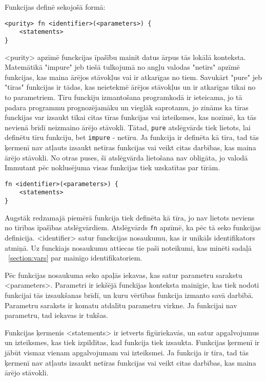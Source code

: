 \documentclass[12pt,a4paper]{report}
\begin{document}
Funkcijas definē sekojošā formā:
\begin{verbatim}
<purity> fn <identifier>(<parameters>) {
    <statements>
}
\end{verbatim}

<purity> apzīmē funckcijas īpašību mainīt datus ārpus tās lokālā konteksta. Matemātikā "impure" jeb tiešā tulkojumā no angļu valodas "netīrs" apzīmē funkcijas, kas maina ārējos stāvokļus vai ir atkarīgas no tiem. Savukārt "pure" jeb "tīras" funkcijas ir tādas, kas neietekmē ārējos stāvokļus un ir atkarīgas tikai no to parametriem. Tīru funckiju izmantošana programkodā ir ieteicama, jo tā padara programmu prognozējamāku un vieglāk saprotamu, jo zināms ka tīras funckijas var izsaukt tikai citas tīras funkcijas vai izteiksmes, kas nozīmē, ka tās nevienā brīdī neizmaino ārējo stāvokli. Tātad, \texttt{pure} atslēgvārds tiek lietots, lai definētu tīru funkciju, bet \texttt{impure} - netīru. Ja funkcija ir definēta kā tīra, tad tās ķermenī nav atļauts izsaukt netīras funkcijas vai veikt citas darbības, kas maina ārējo stāvokli. No otras puses, šī atslēgvārda lietošana nav obligāta, jo valodā Immutant pēc noklusējuma visas funkcijas tiek uzskatītas par tīrām.

\begin{verbatim}
fn <identifier>(<parameters>) {
    <statements>
}
\end{verbatim}

Augstāk redzamajā piemērā funkcija tiek definēta kā tīra, jo nav lietots neviens no tīrības īpašības atslēgvārdiem. Atslēgvārds \texttt{fn} apzīmē, ka pēc tā seko funkcijas definicija. <identifier> satur funckcijas nosaukumu, kas ir unikāls identifikators atmiņā. Uz funckiajs nosaukumu attiecas tie paši noteikumi, kas minēti sadaļā ~\ref{section:vars} par mainīgo identifikatoriem.

Pēc funkcijas nosaukuma seko apaļās iekavas, kas satur parametru sarakstu <parameters>. Parametri ir iekšējā funckijas konteksta mainīgie, kas tiek nodoti funkcijai tās izsaukšanas brīdī, un kuru vērtības funkcija izmanto savā darbībā. Parametru saraksts ir komatu atdalītu parametru virkne. Ja funkcijai nav parametru, tad iekavas ir tukšas.

Funkcijas ķermenis <statements> ir ietverts figūriekavās, un satur apgalvojumus un izteiksmes, kas tiek izpildītas, kad funkcija tiek izsaukta. Funkcijas ķermenī ir jābūt vismaz vienam apgalvojumam vai izteiksmei. Ja funkcija ir tīra, tad tās ķermenī nav atļauts izsaukt netīras funkcijas vai veikt citas darbības, kas maina ārējo stāvokli.
\end{document}
